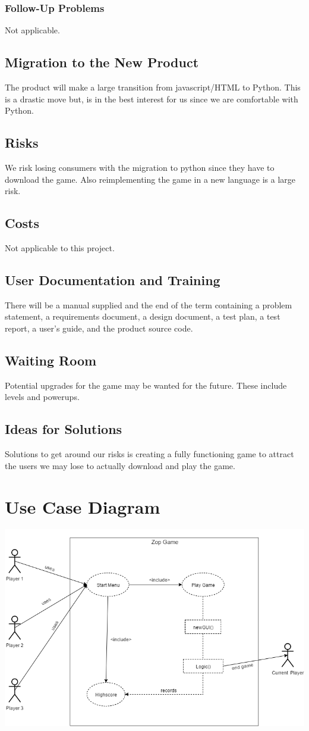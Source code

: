 \documentclass[12pt]{article}
\begin{document}
\subsubsection{Follow-Up Problems}
Not applicable.

\subsection{Migration to the New Product}
The product will make a large transition from javascript/HTML to Python.  This is a drastic move but, is in the best interest for us since we are comfortable with Python.
\subsection{Risks}
We risk losing consumers with the migration to python since they have to download the game. Also reimplementing the game in a new language is a large risk.
\subsection{Costs}
Not applicable to this project.
\subsection{User Documentation and Training}
There will be a manual supplied and the end of the term containing a problem statement, a requirements document, a design document, a test plan, a test
report, a user's guide, and the product source code.
\subsection{Waiting Room}
Potential upgrades for the game may be wanted for the future.  These include levels and powerups.
\subsection{Ideas for Solutions}
Solutions to get around our risks is creating a fully functioning game to attract the users we may lose to actually download and play the game.
\newpage
\section{Use Case Diagram}
\includegraphics[scale=0.69]{usecase}
\end{document}
